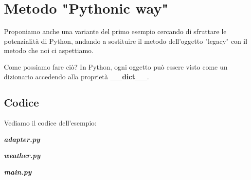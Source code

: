   \section{Metodo "Pythonic way"}
  
  Proponiamo anche una variante del primo esempio cercando di sfruttare le potenzialità
  di Python, andando a sostituire il metodo dell'oggetto "legacy" con il 
  metodo che noi ci aspettiamo. 
  
  Come possiamo fare ciò? In Python, ogni oggetto può essere visto come un 
  dizionario accedendo alla proprietà \textbf{\_\_dict\_\_}.
  
  \subsection{Codice}
  
  Vediamo il codice dell'esempio:
  
  \textbf{\textit{adapter.py}}
  
  
  \textbf{\textit{weather.py}}
  
  
  \textbf{\textit{main.py}}
  
  
  